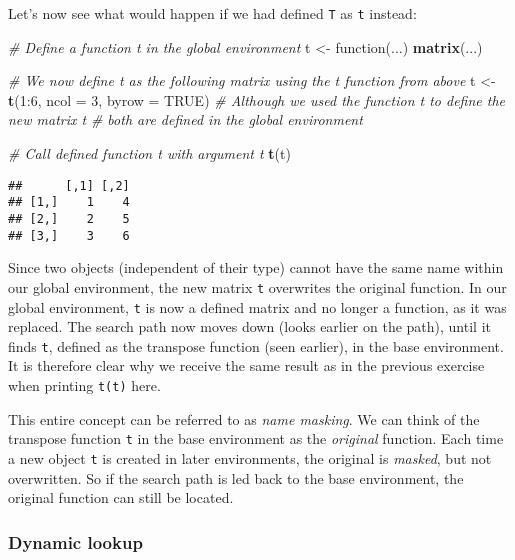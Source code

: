 \documentclass[11,]{article}
\newenvironment{Shaded}{\begin{snugshade}}{\end{snugshade}}
\newcommand{\KeywordTok}[1]{\textcolor[rgb]{0.13,0.29,0.53}{\textbf{{#1}}}}
\newcommand{\DataTypeTok}[1]{\textcolor[rgb]{0.13,0.29,0.53}{{#1}}}
\newcommand{\DecValTok}[1]{\textcolor[rgb]{0.00,0.00,0.81}{{#1}}}
\newcommand{\StringTok}[1]{\textcolor[rgb]{0.31,0.60,0.02}{{#1}}}
\newcommand{\CommentTok}[1]{\textcolor[rgb]{0.56,0.35,0.01}{\textit{{#1}}}}
\newcommand{\OtherTok}[1]{\textcolor[rgb]{0.56,0.35,0.01}{{#1}}}
\newcommand{\NormalTok}[1]{{#1}}
\begin{document}
Let's now see what would happen if we had defined \texttt{T} as
\texttt{t} instead:

\begin{Shaded}
\begin{Highlighting}[]
\CommentTok{# Define a function t in the global environment}
\NormalTok{t <-}\StringTok{ }\NormalTok{function(...) }\KeywordTok{matrix}\NormalTok{(...)}

\CommentTok{# We now define t as the following matrix using the t function from above}
\NormalTok{t <-}\StringTok{ }\KeywordTok{t}\NormalTok{(}\DecValTok{1}\NormalTok{:}\DecValTok{6}\NormalTok{, }\DataTypeTok{ncol =} \DecValTok{3}\NormalTok{, }\DataTypeTok{byrow =} \OtherTok{TRUE}\NormalTok{)}
\CommentTok{# Although we used the function t to define the new matrix t}
\CommentTok{# both are defined in the global environment}

\CommentTok{# Call defined function t with argument t}
\KeywordTok{t}\NormalTok{(t)}
\end{Highlighting}
\end{Shaded}

\begin{verbatim}
##      [,1] [,2]
## [1,]    1    4
## [2,]    2    5
## [3,]    3    6
\end{verbatim}

Since two objects (independent of their type) cannot have the same name
within our global environment, the new matrix \texttt{t} overwrites the
original function. In our global environment, \texttt{t} is now a
defined matrix and no longer a function, as it was replaced. The search
path now moves down (looks earlier on the path), until it finds
\texttt{t}, defined as the transpose function (seen earlier), in the
base environment. It is therefore clear why we receive the same result
as in the previous exercise when printing \texttt{t(t)} here.

This entire concept can be referred to as \emph{name masking}. We can
think of the transpose function \texttt{t} in the base environment as
the \emph{original} function. Each time a new object \texttt{t} is
created in later environments, the original is \emph{masked}, but not
overwritten. So if the search path is led back to the base environment,
the original function can still be located.

\subsubsection{Dynamic lookup}\label{dynamic-lookup}
\end{document}
